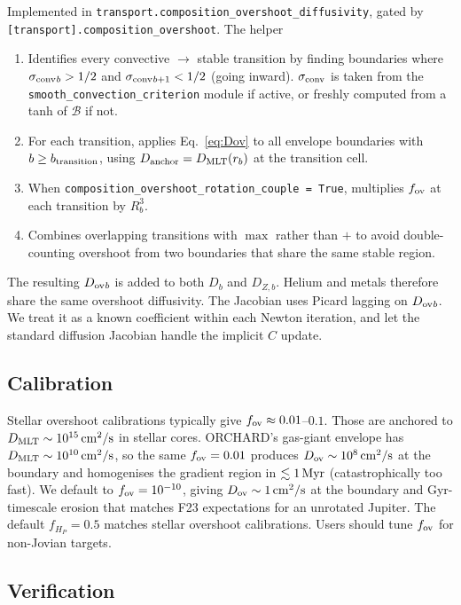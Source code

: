 \documentclass{aastex631}
\newcommand{\Dmlt}{D_{\rm MLT}}
\newcommand{\Dov}{D_{\rm ov}}
\newcommand{\sigmaconv}{\sigma_{\rm conv}}
\newcommand{\fov}{f_{\rm ov}}
\newcommand{\bracketb}{\mathcal{B}}
\begin{document}
Implemented in \texttt{transport.composition\_overshoot\_diffusivity},
gated by \texttt{[transport].composition\_overshoot}.  The helper
\begin{enumerate}
\item Identifies every convective $\to$ stable transition by finding
  boundaries where $\sigmaconv{}_b > 1/2$ and $\sigmaconv{}_{b+1} < 1/2$
  (going inward).  $\sigmaconv$ is taken from the
  \texttt{smooth\_convection\_criterion} module if active, or freshly
  computed from a tanh of $\bracketb$ if not.
\item For each transition, applies Eq.~\ref{eq:Dov} to all envelope
  boundaries with $b \ge b_{\rm transition}$, using
  $D_{\rm anchor} = \Dmlt(r_b)$ at the transition cell.
\item When \texttt{composition\_overshoot\_rotation\_couple = True},
  multiplies $\fov$ at each transition by $R_b^3$.
\item Combines overlapping transitions with $\max$ rather than $+$ to
  avoid double-counting overshoot from two boundaries that share the
  same stable region.
\end{enumerate}
The resulting $\Dov{}_b$ is added to both $D_b$ and $D_{Z,b}$.
Helium and metals therefore share the same overshoot diffusivity.  The
Jacobian uses Picard lagging on $\Dov{}_b$.  We treat it as a known
coefficient within each Newton iteration, and let the standard
diffusion Jacobian handle the implicit $C$ update.

\subsection{Calibration}

Stellar overshoot calibrations \citep[e.g.][]{Herwig2000,Pedersen2018}
typically give $\fov \approx 0.01$--$0.1$.  Those are anchored to
$\Dmlt \sim 10^{15}\,\rm cm^2/s$ in stellar cores.  ORCHARD's
gas-giant envelope has $\Dmlt \sim 10^{10}\,\rm cm^2/s$, so the same
$\fov = 0.01$ produces $\Dov \sim 10^{8}\,\rm cm^2/s$ at the boundary
and homogenises the gradient region in $\lesssim 1\,\rm Myr$
(catastrophically too fast).  We default to $\fov = 10^{-10}$,
giving $\Dov \sim 1\,\rm cm^2/s$ at the boundary and Gyr-timescale
erosion that matches F23 expectations for an unrotated Jupiter.  The
default $f_{H_P} = 0.5$ matches stellar overshoot calibrations.
Users should tune $\fov$ for non-Jovian targets.

\subsection{Verification}
\end{document}
